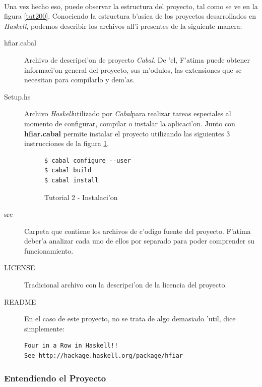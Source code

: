 \documentclass[a4paper]{article}
\newcommand{\haskell}{\textsl{Haskell}}
\newcommand{\cabal}{\textsl{Cabal}}
\begin{document}
\paragraph{}Una vez hecho eso, puede observar la estructura del proyecto, tal como se ve en la figura \ref{tut200}.  Conociendo la estructura b'asica de los proyectos desarrollados en \haskell, podemos describir los archivos all'i presentes de la siguiente manera:
\begin{description}
\item[hfiar.cabal] Archivo de descripci'on de proyecto \cabal.  De 'el, F'atima puede obtener informaci'on general del proyecto, sus m'odulos, las extensiones que se necesitan para compilarlo y dem'as.  
\lstset{language=haskell, frame=single, tabsize=4}
\item[Setup.hs] Archivo \haskell utilizado por \cabal para realizar tareas especiales al momento de configurar, compilar o instalar la aplicaci'on.  Junto con \textbf{hfiar.cabal} permite instalar el proyecto utilizando las siguientes 3 instrucciones de la figura \ref{tut201}.
\begin{figure}[hp]
	\begin{center}
		\begin{center}\begin{lstlisting}
$ cabal configure --user
$ cabal build
$ cabal install
		\end{lstlisting}\end{center}
		\caption{Tutorial 2 - Instalaci'on}
		\label{tut201}
	\end{center}
\end{figure}
\item[src] Carpeta que contiene los archivos de c'odigo fuente del proyecto.  F'atima deber'a analizar cada uno de ellos por separado para poder comprender su funcionamiento.
\item[LICENSE] Tradicional archivo con la descripci'on de la licencia del proyecto.
\item[README] En el caso de este proyecto, no se trata de algo demasiado 'util, dice simplemente:
\begin{verbatim}
Four in a Row in Haskell!!
See http://hackage.haskell.org/package/hfiar
\end{verbatim}
\end{description}

\newpage
\subsubsection{Entendiendo el Proyecto}
\end{document}
